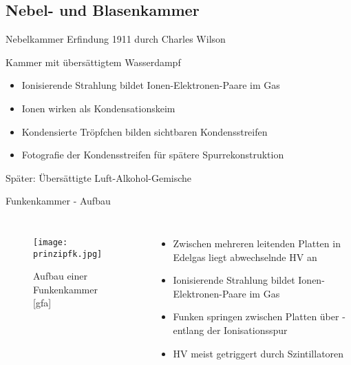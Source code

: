 \subsection[]{Nebel- und Blasenkammer}


\begin{frame}{Nebelkammer}
	Erfindung 1911 durch Charles Wilson
	\vspace{0.7cm}
	\begin{block}{Kammer mit übersättigtem Wasserdampf}
		\begin{itemize}
		  \item Ionisierende Strahlung bildet Ionen-Elektronen-Paare im Gas
		  \item Ionen wirken als Kondensationskeim
		  \item Kondensierte Tröpfchen bilden sichtbaren Kondensstreifen 
		  \item Fotografie der Kondensstreifen für spätere Spurrekonstruktion
		\end{itemize}
	\end{block}
	\vspace{0.7cm}
	Später: Übersättigte Luft-Alkohol-Gemische\\

\end{frame}




\begin{frame}{Funkenkammer - Aufbau}
    \begin{columns}[T]
    
			\begin{figure}[htbp]
			  \centering
			  \texttt{[image: prinzipfk.jpg]}
			  \caption{Aufbau einer Funkenkammer [gfa]}
			\end{figure}
			
	    	\begin{itemize}
			  \item Zwischen mehreren leitenden Platten in Edelgas liegt abwechselnde HV an
			  \item Ionisierende Strahlung bildet Ionen-Elektronen-Paare im Gas
			  \item Funken springen zwischen Platten über - entlang der Ionisationsspur
			  \item HV meist getriggert durch Szintillatoren
			\end{itemize}
    \end{columns}
\end{frame}

